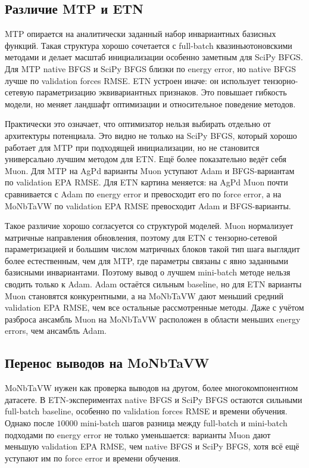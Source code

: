 \subsection{Различие MTP и ETN}

MTP опирается на аналитически заданный набор инвариантных базисных функций. Такая структура хорошо сочетается с full-batch квазиньютоновскими методами и делает масштаб инициализации особенно заметным для SciPy BFGS. Для MTP native BFGS и SciPy BFGS близки по energy error, но native BFGS лучше по validation forces RMSE. ETN устроен иначе: он использует тензорно-сетевую параметризацию эквивариантных признаков. Это повышает гибкость модели, но меняет ландшафт оптимизации и относительное поведение методов.

Практически это означает, что оптимизатор нельзя выбирать отдельно от архитектуры потенциала. Это видно не только на SciPy BFGS, который хорошо работает для MTP при подходящей инициализации, но не становится универсально лучшим методом для ETN. Ещё более показательно ведёт себя Muon. Для MTP на AgPd варианты Muon уступают Adam и BFGS-вариантам по validation EPA RMSE. Для ETN картина меняется: на AgPd Muon почти сравнивается с Adam по energy error и превосходит его по force error, а на MoNbTaVW по validation EPA RMSE превосходит Adam и BFGS-варианты.

Такое различие хорошо согласуется со структурой моделей. Muon нормализует матричные направления обновления, поэтому для ETN с тензорно-сетевой параметризацией и большим числом матричных блоков такой тип шага выглядит более естественным, чем для MTP, где параметры связаны с явно заданными базисными инвариантами. Поэтому вывод о лучшем mini-batch методе нельзя сводить только к Adam. Adam остаётся сильным baseline, но для ETN варианты Muon становятся конкурентными, а на MoNbTaVW дают меньший средний validation EPA RMSE, чем все остальные рассмотренные методы. Даже с учётом разброса ансамбль Muon на MoNbTaVW расположен в области меньших energy errors, чем ансамбль Adam.

\subsection{Перенос выводов на MoNbTaVW}

MoNbTaVW нужен как проверка выводов на другом, более многокомпонентном датасете. В ETN-экспериментах native BFGS и SciPy BFGS остаются сильными full-batch baseline, особенно по validation forces RMSE и времени обучения. Однако после \(10000\) mini-batch шагов разница между full-batch и mini-batch подходами по energy error не только уменьшается: варианты Muon дают меньшую validation EPA RMSE, чем native BFGS и SciPy BFGS, хотя всё ещё уступают им по force error и времени обучения.

